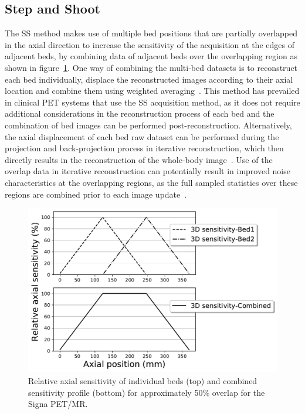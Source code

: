 \subsection{Step and Shoot}
\label{WB_Static_SS}
The SS method makes use of multiple bed positions that are partially overlapped in the axial direction to increase the sensitivity of the acquisition at the edges of adjacent beds, by combining data of adjacent beds over the overlapping region as shown in figure~\ref{fig3_1:fullOverlap}. 
One way of combining the multi-bed datasets is to reconstruct each bed individually, displace the reconstructed images according to their axial location and combine them using weighted averaging~\cite{Schubert1996}. This method has prevailed in clinical PET systems that use the SS acquisition method, as it does not require additional considerations in the reconstruction process of each bed and the combination of bed images can be performed post-reconstruction. Alternatively, the axial displacement of each bed raw dataset can be performed during the projection and back-projection process in iterative reconstruction, which then directly results in the reconstruction of the whole-body image~\cite{Ross2004}. Use of the overlap data in iterative reconstruction can potentially result in improved noise characteristics at the overlapping regions, as the full sampled statistics over these regions are combined prior to each image update~\cite{Ross2004,Stute2014}. 
%
\begin{figure} [ht!]
\centering
\includegraphics[scale=0.6,angle=0]{2_Theory_Methods/figures/SensitivityProfiles_fullOverlap.pdf}
\caption{Relative axial sensitivity of individual beds (top) and combined sensitivity profile (bottom) for approximately 50\% overlap for the Signa PET/MR.}
\label{fig3_1:fullOverlap}
\end{figure}
